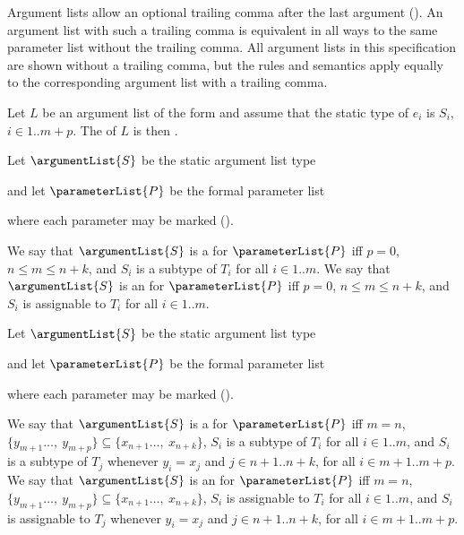 \documentclass[makeidx]{article}
\begin{document}
\LMHash{}%
Argument lists allow an optional trailing comma after the last argument ().
An argument list with such a trailing comma is equivalent in all ways to the same parameter list without the trailing comma.
All argument lists in this specification are shown without a trailing comma,
but the rules and semantics apply equally to the corresponding argument list with a trailing comma.

\LMHash{}%
Let $L$ be an argument list of the form
and assume that the static type of $e_i$ is $S_i$, $i \in 1 .. m+p$.
The  of $L$ is then
.

\LMHash{}%
Let $\argumentList{S}$ be the static argument list type


\noindent
and let $\parameterList{P}$ be the formal parameter list


\noindent
where each parameter may be marked \COVARIANT{} ().

\LMHash{}%
We say that $\argumentList{S}$ is
a  for $\parameterList{P}$
if{}f $p = 0$, $n \leq m \leq n+k$, and $S_i$ is a subtype of $T_i$ for all $i \in 1 .. m$.
We say that $\argumentList{S}$ is
an  for $\parameterList{P}$
if{}f $p = 0$, $n \leq m \leq n+k$, and $S_i$ is assignable to $T_i$ for all $i \in 1 .. m$.

\LMHash{}%
Let $\argumentList{S}$ be the static argument list type


\noindent
and let $\parameterList{P}$ be the formal parameter list


\noindent
where each parameter may be marked \COVARIANT{} ().

\LMHash{}%
We say that $\argumentList{S}$ is
a  for $\parameterList{P}$
if{}f $m = n$,
$\{y_{m+1}\ldots,\ y_{m+p}\} \subseteq \{x_{n+1}\ldots,\ x_{n+k}\}$,
$S_i$ is a subtype of $T_i$ for all $i \in 1 .. m$,
and $S_i$ is a subtype of $T_j$ whenever $y_i = x_j$ and
$j \in n + 1 .. n + k$, for all
$i \in m + 1 .. m + p$.
We say that $\argumentList{S}$
is an  for $\parameterList{P}$
if{}f $m = n$,
$\{y_{m+1}\ldots,\ y_{m+p}\} \subseteq \{x_{n+1}\ldots,\ x_{n+k}\}$,
$S_i$ is assignable to $T_i$ for all $i \in 1 .. m$,
and $S_i$ is assignable to $T_j$ whenever $y_i = x_j$ and
$j \in n + 1 .. n + k$, for all
$i \in m + 1 .. m + p$.
\end{document}
